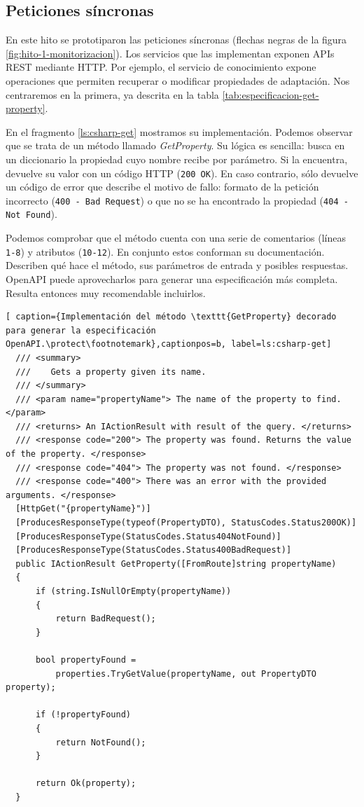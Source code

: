 \subsection{Peticiones síncronas}

En este hito se prototiparon las peticiones síncronas (flechas negras de la figura \ref{fig:hito-1-monitorizacion}). Los servicios que las implementan exponen APIs REST mediante  HTTP. Por ejemplo, el servicio de conocimiento expone operaciones que permiten recuperar o modificar propiedades de adaptación. Nos centraremos en la primera, ya descrita en la tabla \ref{tab:especificacion-get-property}.

En el fragmento \ref{ls:csharp-get} mostramos su implementación. Podemos observar que se trata de un método llamado \emph{GetProperty}. Su lógica es sencilla: busca en un diccionario la propiedad cuyo nombre recibe por parámetro. Si la encuentra, devuelve su valor con un código HTTP (\texttt{200 OK}). En caso contrario, sólo devuelve un código de error que describe el motivo de fallo: formato de la petición incorrecto (\texttt{400 - Bad Request}) o que no se ha encontrado la propiedad (\texttt{404 - Not Found}).

Podemos comprobar que el método cuenta con una serie de comentarios (líneas \texttt{1-8}) y atributos (\texttt{10-12}). En conjunto estos conforman su documentación. Describen qué hace el método, sus parámetros de entrada y posibles respuestas. OpenAPI puede aprovecharlos para generar una especificación más completa. Resulta entonces muy recomendable incluirlos.

\begin{lstlisting}[ caption={Implementación del método \texttt{GetProperty} decorado para generar la especificación OpenAPI.\protect\footnotemark},captionpos=b, label=ls:csharp-get]
  /// <summary>
  ///    Gets a property given its name.
  /// </summary>
  /// <param name="propertyName"> The name of the property to find. </param>
  /// <returns> An IActionResult with result of the query. </returns>
  /// <response code="200"> The property was found. Returns the value of the property. </response>
  /// <response code="404"> The property was not found. </response>
  /// <response code="400"> There was an error with the provided arguments. </response>
  [HttpGet("{propertyName}")]
  [ProducesResponseType(typeof(PropertyDTO), StatusCodes.Status200OK)]
  [ProducesResponseType(StatusCodes.Status404NotFound)]
  [ProducesResponseType(StatusCodes.Status400BadRequest)]
  public IActionResult GetProperty([FromRoute]string propertyName)
  {
      if (string.IsNullOrEmpty(propertyName))
      {
          return BadRequest();
      }

      bool propertyFound =
          properties.TryGetValue(propertyName, out PropertyDTO property);

      if (!propertyFound)
      {
          return NotFound();
      }

      return Ok(property);
  }
\end{lstlisting}

